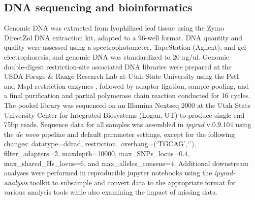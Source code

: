\documentclass[11pt]{article}
\begin{document}
\subsection{DNA sequencing and bioinformatics}
Genomic DNA was extracted from lyophilized leaf tissue using the Zymo DirectZol DNA
extraction kit, adapted to a 96-well format. 
DNA quantity and quality were assessed using a spectrophotometer, TapeStation 
(Agilent), and gel electrophoresis, and genomic DNA was standardized to 20 ng/ul. 
% 
Genomic double-digest restriction-site associated DNA \citep[ddRAD-seq;][]{peterson_double_2012}
libraries were prepared at the USDA Forage \& Range Research Lab at 
Utah State University using the PstI and MspI restriction enzymes
\citep{poland_development_2012},
followed by adaptor ligation, sample pooling, and a final purification
and partial polymerase chain reaction conducted for 16 cycles. 
% 
The pooled library was sequenced on an Illumina Nextseq 2000 at the Utah State 
University Center for Integrated Biosystems (Logan, UT) to produce single-end
75bp reads. 
% 
Sequence data for all samples was assembled in \emph{ipyrad} 
v.0.9.104 \citep{eaton_ipyrad_2020} using the \emph{de novo} 
pipeline and default parameter settings, except for the following
changes: datatype=ddrad, restriction\_overhang=(`TGCAG',`'),
filter\_adapters=2, maxdepth=10000, max\_SNPs\_locus=0.4,
max\_shared\_Hs\_locus=6, and max\_alleles\_consens=4. 
% 
% 
Additional downstream analyses were performed in reproducible jupyter notebooks
using the \emph{ipyrad-analysis} toolkit to subsample and convert data to the
appropriate format for various analysis tools while also examining the impact of
missing data.
\end{document}

